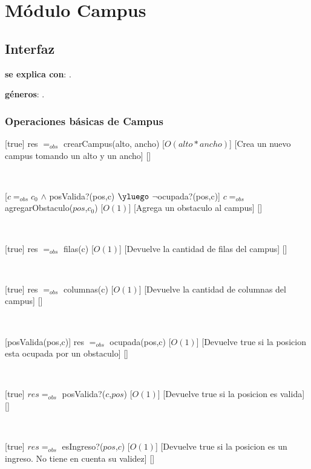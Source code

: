 \section{Módulo Campus}

\subsection{Interfaz}

\textbf{se explica con}: .

\textbf{géneros}: .

\subsubsection{Operaciones básicas de Campus}

[true]
{res $=_{obs}$ crearCampus(alto, ancho)}
[$O(alto * ancho)$]
[Crea un nuevo campus tomando un alto y un ancho]
[]

~

[$c =_{obs} c_0$ $\land$ posValida?(pos,c) $\yluego$ $\neg$ocupada?(pos,c)]
{$c =_{obs}$ agregarObstaculo($pos$,$c_0$)}
[$O(1)$]
[Agrega un obstaculo al campus]
[]

~

[true]
{res $=_{obs}$ filas(c)}
[$O(1)$]
[Devuelve la cantidad de filas del campus]
[]

~

[true]
{res $=_{obs}$ columnas(c)}
[$O(1)$]
[Devuelve la cantidad de columnas del campus]
[]

~


[posValida(pos,c)]
{res $=_{obs}$ ocupada(pos,c)}
[$O(1)$]
[Devuelve true si la posicion esta ocupada por un obstaculo]
[]

~

[true]
{$res =_{obs}$ posValida?($c$,$pos$)}
[$O(1)$]
[Devuelve true si la posicion es valida]
[]

~

[true]
{$res =_{obs}$ esIngreso?($pos$,$c$)}
[$O(1)$]
[Devuelve true si la posicion es un ingreso. No tiene en cuenta su validez]
[]


